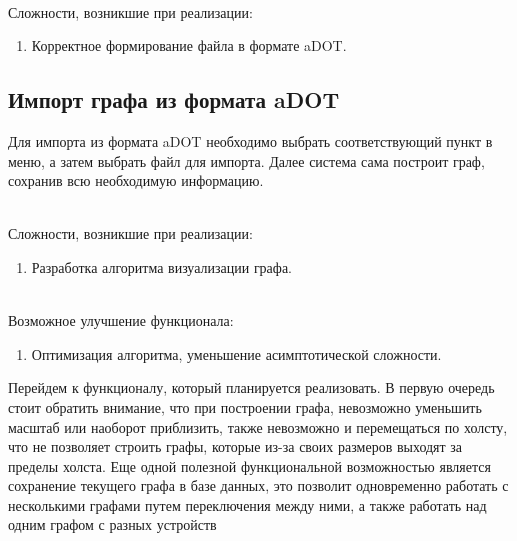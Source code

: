~\\Сложности, возникшие при реализации:
\begin{enumerate}
	\item Корректное формирование файла в формате aDOT.
\end{enumerate}

\subsection{Импорт графа из формата aDOT}
Для импорта из формата aDOT необходимо выбрать соответствующий пункт в меню, а затем выбрать файл для импорта. Далее система сама построит граф, сохранив всю необходимую информацию.

~\\Сложности, возникшие при реализации:
\begin{enumerate}
	\item Разработка алгоритма визуализации графа.
\end{enumerate}

~\\Возможное улучшение функционала:
\begin{enumerate}
	\item Оптимизация алгоритма, уменьшение асимптотической сложности.
\end{enumerate}

Перейдем к функционалу, который планируется реализовать. В первую очередь стоит обратить внимание, что при построении графа, невозможно уменьшить масштаб или наоборот приблизить, также невозможно и перемещаться по холсту, что не позволяет строить графы, которые из-за своих размеров выходят за пределы холста. Еще одной полезной функциональной возможностью является сохранение текущего графа в базе данных, это позволит одновременно работать с несколькими графами путем переключения между ними, а также работать над одним графом с разных устройств 

